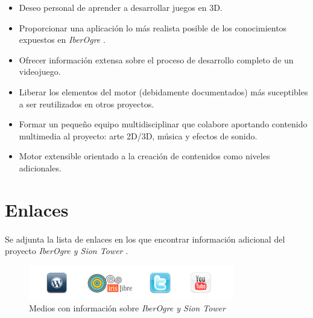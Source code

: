 \documentclass[16pt,spanish]{article}
\def \proyecto{\emph {IberOgre y Sion Tower} }
\def \wiki{\emph{IberOgre} }
\begin{document}
\begin{itemize}
    \item Deseo personal de aprender a desarrollar juegos en 3D.
    \item Proporcionar una aplicación lo más realista posible de los
    conocimientos expuestos en \wiki.
    \item Ofrecer información extensa sobre el proceso de desarrollo completo
    de un videojuego.
    \item Liberar los elementos del motor (debidamente documentados) más
    suceptibles a ser reutilizados en otros proyectos.
    \item Formar un pequeño equipo multidisciplinar que colabore aportando
    contenido multimedia al proyecto: arte 2D/3D, música y efectos de sonido.
    \item Motor extensible orientado a la creación de contenidos como
    niveles adicionales.
\end{itemize}

\section{Enlaces}

\paragraph{}
Se adjunta la lista de enlaces en los que encontrar información adicional
del proyecto \proyecto.

\begin{figure}[H]
    \centering
        \includegraphics[width=9cm]{img/enlaces.png} 
    \caption{Medios con información sobre \proyecto}
    \label{img:enlaces}
\end{figure}
\end{document}
